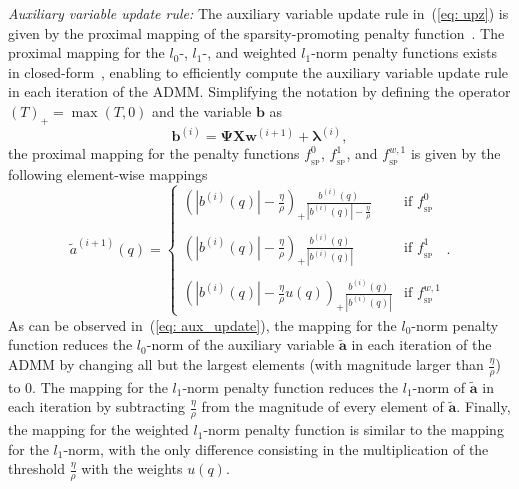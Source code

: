 \documentclass[10pt]{IEEEtran}
\begin{document}
{\textit{Auxiliary variable update rule:}} \enspace The auxiliary variable update rule in~(\ref{eq: upz}) is given by the proximal mapping of the sparsity-promoting penalty function~\cite{Chartrand_ICASSP_2014,parikh2014proximal}. The proximal mapping for the $l_0$-, $l_1$-, and weighted $l_1$-norm penalty functions exists in closed-form~\cite{Chartrand_ICASSP_2014,parikh2014proximal}, enabling to efficiently compute the auxiliary variable update rule in each iteration of the ADMM.
Simplifying the notation by defining the operator $\left(T \right)_{+} = \max (T,0)$ and the variable $\mathbf{b}$ as
\begin{equation}
\mathbf{b}^{(i)}= \mathbf{\Psi}\mathbf{X}\mathbf{w}^{(i+1)} + \boldsymbol{\lambda}^{(i)},
\end{equation} 
the proximal mapping for the penalty functions $f_{_{\text{SP}}}^0$, $f_{_{\text{SP}}}^1$, and $f_{_{\text{SP}}}^{w,1}$ is given by the following element-wise mappings
\begin{equation}
  \label{eq: aux_update}
   \tilde{a}^{(i+1)}(q) =
  \begin{cases}
   \left(\left|b^{(i)}(q)\right| - \frac{\eta}{\rho} \right)_+ \frac{ b^{(i)}(q) }{ \left|b^{(i)}(q)\right| - \frac{\eta}{\rho} } & \text{if } f_{_{\text{SP}}}^0 \\ \\
   \left( \left|b^{(i)}(q)\right| - \frac{\eta}{\rho} \right)_+\frac{b^{(i)}(q)}{\left|b^{(i)}(q)\right|} & \text{if } f_{_{\text{SP}}}^1 \\ \\
   \left( \left|b^{(i)}(q)\right| - \frac{\eta}{\rho}u(q) \right)_+\frac{b^{(i)}(q)}{\left|b^{(i)}(q)\right|} & \text{if } f_{_{\text{SP}}}^{w,1}
   \end{cases}.
  \end{equation}
  As can be observed in~(\ref{eq: aux_update}), the mapping for the $l_0$-norm penalty function reduces the $l_0$-norm of the auxiliary variable $\tilde{\mathbf{a}}$ in each iteration of the ADMM by changing all but the largest elements (with magnitude larger than $\frac{\eta}{\rho}$) to $0$.
  The mapping for the $l_1$-norm penalty function reduces the $l_1$-norm of $\tilde{\mathbf{a}}$ in each iteration by subtracting $\frac{\eta}{\rho}$ from the magnitude of every element of $\tilde{\mathbf{a}}$.
  Finally, the mapping for the weighted $l_1$-norm penalty function is similar to the mapping for the $l_1$-norm, with the only difference consisting in the multiplication of the threshold $\frac{\eta}{\rho}$ with the weights $u(q)$. 
\end{document}
